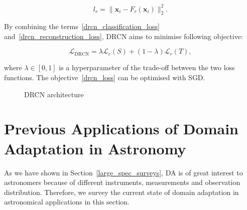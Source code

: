 \begin{equation}
	l_r = \|\mathbf{x}_i - F_r(\mathbf{x}_i)\|_2^2.
\end{equation}

By combining the terms~\ref{drcn_classification_loss} and~\ref{drcn_reconstruction_loss},
DRCN aims to minimise following objective:

\begin{equation}
	\mathcal{L}_{\mathrm{DRCN}}
	= \lambda \mathcal{L}_c(S) + (1 - \lambda) \mathcal{L}_r(T),
	\label{drcn_loss}
\end{equation}

where \(\lambda \in [0, 1]\) is a hyperparameter of the trade-off between the two loss functions.
The objective~\ref{drcn_loss} can be optimised with SGD.

\begin{figure}
\begin{center}
\end{center}
\caption{DRCN architecture}
\end{figure}

\section{Previous Applications of Domain Adaptation in Astronomy}


As we have shown in Section~\ref{large_spec_surveys},
DA is of great interest to astronomers
because of different instruments, measurements and observation distribution.
Therefore, we survey the current state of domain adaptation in astronomical applications in this section.

